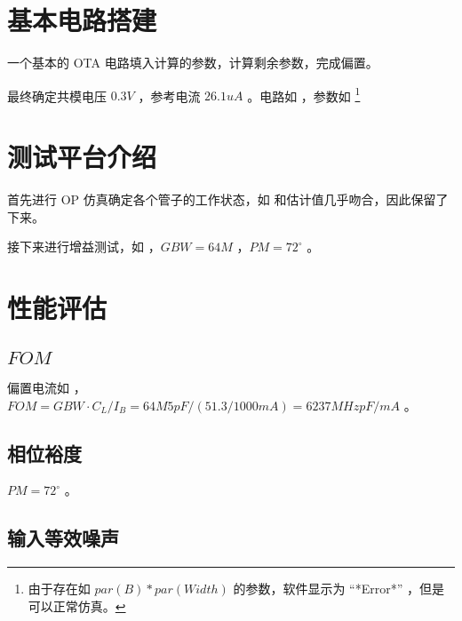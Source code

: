\documentclass[lang=cn,11pt,a4paper,cite=authoryear]{elegantpaper}
\begin{document}
\section{基本电路搭建}

一个基本的 OTA 电路填入计算的参数，计算剩余参数，完成偏置。


最终确定共模电压 \(0.3V\) ，参考电流 \(26.1 uA\) 。电路如  ，参数如  \footnote{由于存在如 \(par(B)*par(Width)\) 的参数，软件显示为 “*Error*” ，但是可以正常仿真。}


\section{测试平台介绍}

首先进行 OP 仿真确定各个管子的工作状态，如  和估计值几乎吻合，因此保留了下来。


接下来进行增益测试，如  ，\(GBW = 64 M\) ，\(PM = 72^\circ\) 。


\section{性能评估}

\subsection{\(FOM\)}

偏置电流如  ，\(FOM = GBW \cdot C_L / I_B = 64M 5 pF / (51.3 / 1000 mA) = 6237MHz pF/mA\) 。


\subsection{相位裕度}

\(PM = 72^\circ\) 。

\subsection{输入等效噪声}
\end{document}
